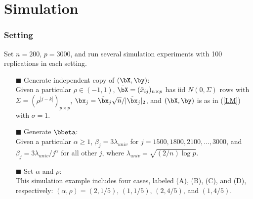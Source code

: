 


\section{Simulation}
\begin{frame}
\sectionpage
\end{frame}


\begin{frame}
\frametitle{Setting}
Set $n=200$, $p=3000$, and run several simulation experiments with
100 replications in each setting.
\begin{itemize}
\item[$\blacksquare$] Generate independent copy of $(\bX,\by)$: \\
Given a particular $\rho \in(-1,1)$, $\tilde{\bX} = (\tilde{x}_{ij})_{n\times p}$
has iid $N(0,\Sigma)$ rows with $\Sigma = (\rho^{|j-k|})_{p\times p}$,
$\bx_j = \tilde{\bx}_j\sqrt{n}/{|}\tilde{\bx}_j{|}_2$, and $(\bX,\by)$ is as in (\ref{LM}) with $\sigma=1$.
\item[$\blacksquare$] Generate $\bbeta$: \\
Given a particular $\alpha \geq 1$, $\beta_j = 3\lambda_{univ}$ for $j = 1500, 1800, 2100, \ldots, 3000$,
and $\beta_j = 3\lambda_{univ}/j^\alpha$ for all other $j$, where $\lambda_{univ}=\sqrt{(2/n)\log p}$.
\item[$\blacksquare$] Set $\alpha$ and $\rho$: \\
This simulation example includes four cases, labeled (A), (B), (C), and (D), respectively:
$(\alpha,\rho)=(2,1/5)$, $(1,1/5)$, $(2,4/5)$, and $(1,4/5)$.
\end{itemize}
\end{frame}


